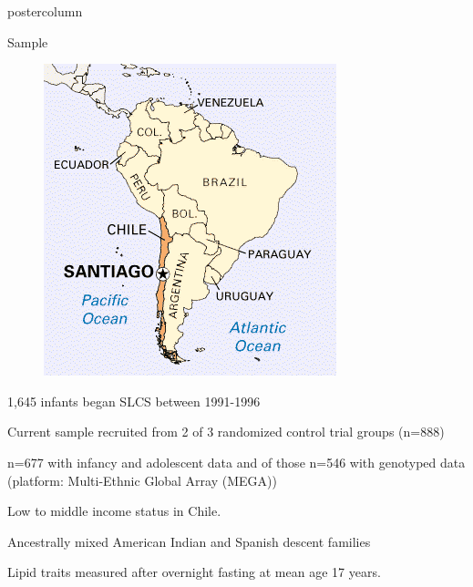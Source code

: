 \documentclass[final]{beamer}\usepackage[]{graphicx}\usepackage[]{color}
\newlength{\onecolwid}
\begin{document}
\begin{frame}[t]
\begin{columns}[T]
\begin{column}{\onecolwid}
\begin{beamercolorbox}[wd=\textwidth]{postercolumn}
\begin{block}{Sample}
\begin{itemize}
    \parbox[t]{\dimexpr\textwidth-\leftmargin}{%
\raggedright
      \begin{figure}
        \centering
        \includegraphics[width=\linewidth]{santiago-map.png}
      \end{figure}
\normalsize{
          \item 1,645 infants began SLCS between 1991-1996
          \item \raggedright Current sample recruited from 2 of 3 randomized control trial groups (n=888)
          \item  n=677 with infancy and adolescent data and of those n=546 with genotyped data (platform: Multi-Ethnic Global Array (MEGA))
          \item Low to middle income status in Chile.
          \item Ancestrally mixed American Indian and Spanish descent families
          \item Lipid traits measured after overnight fasting at mean age 17 years.
          }
    }
  \end{itemize}


\end{block}
\end{beamercolorbox}
\end{column}
\end{columns}
\end{frame}
\end{document}
